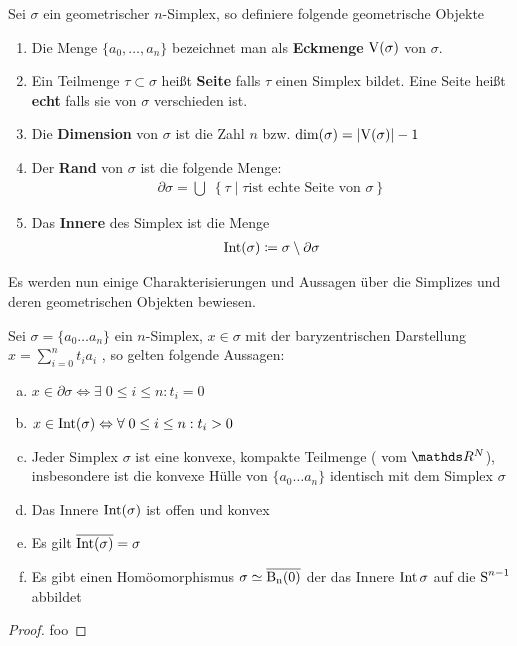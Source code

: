 \begin{Def}
  Sei $\sigma$ ein geometrischer $n$-Simplex, so definiere folgende
  geometrische Objekte
  \begin{enumerate}[\textbullet]%
  \item Die Menge $\{ a_0 , \ldots , a_n \}$ bezeichnet man als
    \textbf{Eckmenge} $\operatorname{V}(\sigma)$ von $\sigma$.
  \item Ein Teilmenge $\tau \subset \sigma$ heißt \textbf{Seite} falls
	  $\tau$ einen Simplex bildet. Eine Seite heißt \textbf{echt} falls sie von 
		$\sigma$ verschieden ist.
	\item Die \textbf{Dimension} von $\sigma$ ist die Zahl $n$ bzw. 
		$\dim(\sigma) = \left| \operatorname{V}(\sigma) \right| - 1$
  \item Der \textbf{Rand} von $\sigma$ ist die folgende Menge:
    \begin{gather*}
      \partial\sigma = \bigcup \; \left\{ \tau \; \Big| \; \tau \text{
          ist echte Seite von } \sigma \right\}
    \end{gather*}
  \item Das \textbf{Innere} des Simplex ist die Menge
    \begin{gather*}
    	\operatorname{Int}(\sigma) \coloneqq \sigma \setminus \partial\sigma
    \end{gather*}
  \end{enumerate}
\end{Def}


Es werden nun einige Charakterisierungen und Aussagen über die
Simplizes und deren geometrischen Objekten bewiesen.

\begin{Satz}
  \normalfont Sei $\sigma = \{ a_0 \ldots a_n \}$ ein $n$-Simplex,
  $x \in \sigma$ mit der baryzentrischen Darstellung
  $x=\sum\limits_{i=0}^n t_i a_i$ , so gelten folgende Aussagen:
  \begin{enumerate}[(a)]
  \item
    $x \in \partial\sigma \Leftrightarrow \exists \; 0 \leq i \leq n :
    t_i = 0$
  \item
    $x \in \operatorname{Int}(\sigma) \Leftrightarrow \forall \; 0 \leq i \leq n :
    t_i > 0$
  \item Jeder Simplex $\sigma$ ist eine konvexe, kompakte Teilmenge (
    vom $\R^N$), insbesondere ist die konvexe Hülle von
    $\{ a_0 \ldots a_n \}$ identisch mit dem Simplex $\sigma$
  \item Das Innere $\operatorname{Int}(\sigma)$ ist offen und konvex
  \item Es gilt $\overline{\operatorname{Int}(\sigma)} = \sigma$
  \item Es gibt einen Homöomorphismus $\sigma \simeq \operatorname{\overline{\operatorname{B}_n(0)}}$ der das
    Innere $\operatorname{Int}{\sigma}$ auf die $\operatorname{S}^{n-1}$ abbildet
  \end{enumerate}
  \begin{proof}
    foo
  \end{proof}
\end{Satz}







